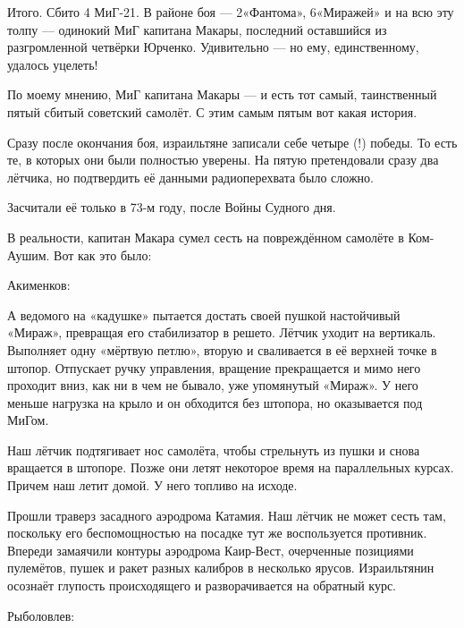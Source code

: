 Итого. Сбито 4 МиГ-21. В районе боя — 2«Фантома», 6«Миражей» и на всю эту толпу — одинокий МиГ капитана Макары, последний оставшийся из разгромленной четвёрки Юрченко. Удивительно — но ему, единственному, удалось уцелеть!

По моему мнению, МиГ капитана Макары — и есть тот самый, таинственный пятый сбитый советский самолёт. С этим самым пятым вот какая история.

Сразу после окончания боя, израильтяне записали себе четыре (!) победы. То есть те, в которых они были полностью уверены. На пятую претендовали сразу два лётчика, но подтвердить её данными радиоперехвата было сложно.

Засчитали её только в 73-м году, после Войны Судного дня.

В реальности, капитан Макара сумел сесть на повреждённом самолёте в Ком-Аушим. Вот как это было:

Акименков:

\begin{textcitation}
	А ведомого на «кадушке» пытается достать своей пушкой настойчивый «Мираж», превращая его стабилизатор в решето. Лётчик уходит на вертикаль. Выполняет одну «мёртвую петлю», вторую и сваливается в её верхней точке в штопор. Отпускает ручку управления, вращение прекращается и мимо него проходит вниз, как ни в чем не бывало, уже упомянутый «Мираж». У него меньше нагрузка на крыло и он обходится без штопора, но оказывается под МиГом.
	
	Наш лётчик подтягивает нос самолёта, чтобы стрельнуть из пушки и снова вращается в штопоре. Позже они летят некоторое время на параллельных курсах. Причем наш летит домой. У него топливо на исходе.
	
	Прошли траверз засадного аэродрома Катамия. Наш лётчик не может сесть там, поскольку его беспомощностью на посадке тут же воспользуется противник. Впереди замаячили контуры аэродрома Каир-Вест, очерченные позициями пулемётов, пушек и ракет разных калибров в несколько ярусов. Израильтянин осознаёт глупость происходящего и разворачивается на обратный курс.
\end{textcitation}
Рыболовлев:

